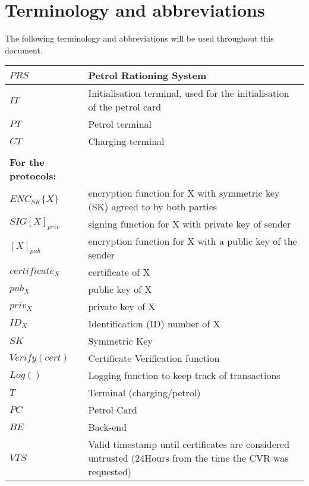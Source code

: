 \section{Terminology and abbreviations}
The following terminology and abbreviations will be used throughout this document. 
    \begin{center}
        \begin{tabular}{| l | p{8cm} |}
            \hline
            $PRS$ & Petrol Rationing System\\\hline
            $IT$ & Initialisation terminal, used for the initialisation of the petrol card \\\hline
            $PT$ & Petrol terminal \\\hline
            $CT$ & Charging terminal \\\hline
            &\\\hline
            \textbf{For the protocols:} &\\\hline
            $ENC_{SK}\{X\}$ & encryption function for X with symmetric key (SK) agreed to by both parties\\ \hline
            $SIG[X]_{priv}$ & signing function for X with private key of sender \\ \hline
            $[X]_{pub}$ & encryption function for X with a public key of the sender \\ \hline
            $certificate_{X}$ & certificate of X \\ \hline
            $pub_{X}$ & public key of X \\ \hline
            $priv_{X}$ & private key of X  \\ \hline
            $ID_{X}$ & Identification (ID) number of X \\ \hline
            $SK$ & Symmetric Key \\ \hline
            $Verify(cert)$ & Certificate Verification function\\ \hline
            $Log()$ & Logging function to keep track of transactions \\ \hline
            $T$ & Terminal (charging/petrol) \\ \hline
            $PC$ & Petrol Card \\ \hline
            $BE$ & Back-end \\ \hline
            $VTS$ & Valid timestamp until certificates are considered untrusted (24Hours from the time the CVR was requested) \\ \hline

\end{tabular}
\end{center}
